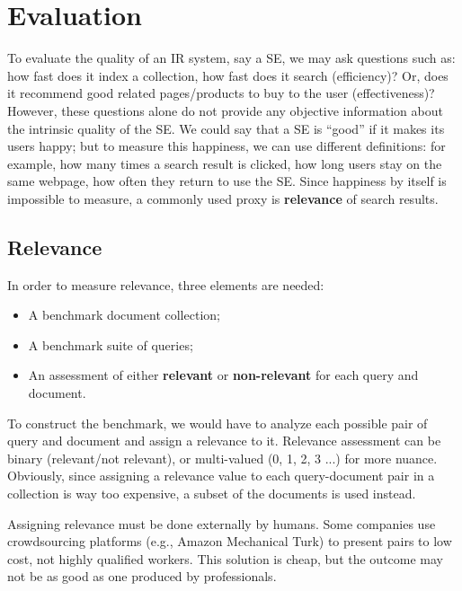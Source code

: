 \chapter{Evaluation}

To evaluate the quality of an IR system, say a SE, we may ask questions such as: how fast does it index a collection, how fast does it search (efficiency)? Or, does it recommend good related pages/products to buy to the user (effectiveness)? However, these questions alone do not provide any objective information about the intrinsic quality of the SE. We could say that a SE is ``good'' if it makes its users happy; but to measure this happiness, we can use different definitions: for example, how many times a search result is clicked, how long users stay on the same webpage, how often they return to use the SE. Since happiness by itself is impossible to measure, a commonly used proxy is \textbf{relevance} of search results.

\section{Relevance}

In order to measure relevance, three elements are needed:
\begin{itemize}
    \item A benchmark document collection;
    \item A benchmark suite of queries;
    \item An assessment of either \textbf{relevant} or \textbf{non-relevant} for each query and document.
\end{itemize}
To construct the benchmark, we would have to analyze each possible pair of query and document and assign a relevance to it. Relevance assessment can be binary (relevant/not relevant), or multi-valued (0, 1, 2, 3 ...) for more nuance. Obviously, since assigning a relevance value to each query-document pair in a collection is way too expensive, a subset of the documents is used instead.

Assigning relevance must be done externally by humans. Some companies use crowdsourcing platforms (e.g., Amazon Mechanical Turk) to present pairs to low cost, not highly qualified workers. This solution is cheap, but the outcome may not be as good as one produced by professionals. 

